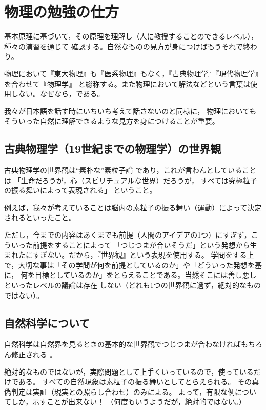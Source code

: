 ﻿\section{物理の勉強の仕方}

基本原理に基づいて，その原理を理解し（人に教授することのできるレベル），種々の演習を通じて
確認する。自然なものの見方が身につけばもうそれで終わり。

物理において『東大物理』も『医系物理』もなく，『古典物理学』『現代物理学』を合わせて『物理学』
と総称する。また物理において解法などという言葉は使用しない。なぜなら，である。

我々が日本語を話す時にいちいち考えて話さないのと同様に，
物理においてもそういった自然に理解できるような見方を身につけることが重要。
\subsection{古典物理学（19世紀までの物理学）の世界観}

古典物理学の世界観は“素朴な”素粒子論
であり，これが言わんとしていることは
「生命だろうが，心（スピリチュアルな世界）だろうが，
すべては究極粒子の振る舞いによって表現される」
ということ。

例えば，我々が考えていることは脳内の素粒子の振る舞い（運動）によって決定されるといったこと。

ただし，今までの内容はあくまでも前提（人間のアイデアの1つ）にすぎず，こういった前提をすることによって
「つじつまが合いそうだ」という発想から生まれたにすぎない。だから，『世界観』という表現を使用する。
学問をする上で，大切な事は「その学問が何を前提としているのか」や「どういった発想を基に，
何を目標としているのか」をとらえることである。当然そこには善し悪しといったレベルの議論は存在
しない（どれも1つの世界観に過ず，絶対的なものではない）。
\subsection{自然科学について}

自然科学は自然界を見るときの基本的な世界観でつじつまが合わなければもちろん修正される
。

絶対的なものではないが，実際問題として上手くいっているので，使っているだけである。
すべての自然現象は素粒子の振る舞いとしてとらえられる。
その真偽判定は実証（現実との照らし合わせ）のみによる。
よって，有限な例についてしか，示すことが出来ない！
（何度もいうようだが，絶対的ではない。）

